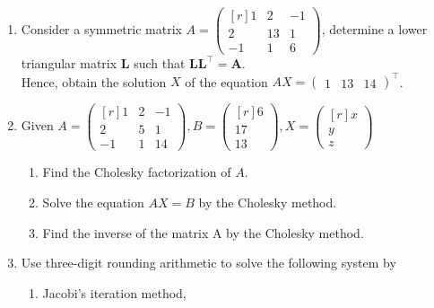 \documentclass[12pt,class=book,crop=false]{standalone}
\begin{document}
\begin{enumerate}
\begin{enumerate}
\begin{enumerate}
                    \end{enumerate}
          \end{enumerate}
    \item Consider a symmetric matrix  $ A =
              \begin{pmatrix*}[r]
                  1 & 2 & -1\\
                  2 & 13 & 1\\
                  -1 & 1 & 6
              \end{pmatrix*}
          $, determine a lower triangular matrix $ \mathbf{L} $ such that $\mathbf{L} \mathbf{L}^\top = \mathbf{A}$.\\
          Hence, obtain the solution $ X $ of the equation $ A X = \begin{pmatrix}
                  1 & 13 & 14
              \end{pmatrix}^\top
          $.
    \item Given   $A =\begin{pmatrix*}[r]
                  1 & 2 & -1\\
                  2 & 5&1\\
                  -1&1&14
              \end{pmatrix*}
              ,B =\begin{pmatrix*}[r]
                  6\\
                  17\\
                  13
              \end{pmatrix*}
              ,   X = \begin{pmatrix*}[r]
                  x\\
                  y\\
                  z
              \end{pmatrix*}$
          \begin{enumerate}
              \item Find the Cholesky factorization of $ A $.
              \item Solve the equation $ A X = B $ by the Cholesky method.
              \item Find the inverse of the matrix A by the Cholesky method.
          \end{enumerate}
    \item Use three-digit rounding arithmetic to solve the following system by
          \begin{enumerate}
              \item Jacobi's iteration method,

\end{enumerate}
\end{enumerate}
\end{document}
